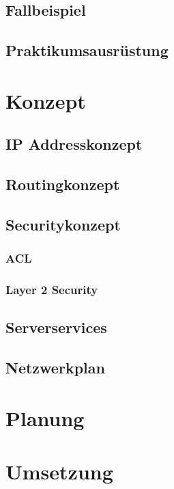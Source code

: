 \documentclass[12pt,a4paper,titlepage]{article}
\begin{document}
\subsection{Fallbeispiel } 
\subsection{Praktikumsausrüstung} 
\section{Konzept}
\subsection{IP Addresskonzept } 
\subsection{Routingkonzept} 
\subsection{Securitykonzept} 
\subsubsection{ACL}
\subsubsection{Layer 2 Security}
\subsection{Serverservices}
\subsection{Netzwerkplan}
\section{Planung}
\section{Umsetzung}
\end{document}
